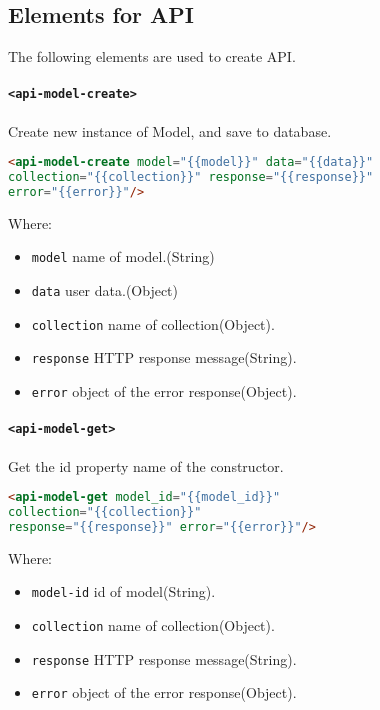 \subsection{Elements for API}\cite{xpr_api}

The following elements are used to create API.

\paragraph{\texttt{<api-model-create>}}

Create new instance of Model, and save to database.

\begin{lstlisting}[language=html]
<api-model-create model="{{model}}" data="{{data}}" 
collection="{{collection}}" response="{{response}}" 
error="{{error}}"/>
\end{lstlisting}
Where:
\begin{itemize}
\item \texttt{model} name of model.(String)
\item \texttt{data} user data.(Object)
\item \texttt{collection} name of collection(Object).
\item \texttt{response}	HTTP response message(String).
\item \texttt{error} object of the error response(Object).
\end{itemize}

\paragraph{\texttt{<api-model-get>}}

Get the id property name of the constructor.

\begin{lstlisting}[language=html]
<api-model-get model_id="{{model_id}}" 
collection="{{collection}}" 
response="{{response}}" error="{{error}}"/>
\end{lstlisting}
Where:
\begin{itemize}
\item \texttt{model-id} id of model(String).
\item \texttt{collection} name of collection(Object).
\item \texttt{response}	HTTP response message(String).
\item \texttt{error} object of the error response(Object).
\end{itemize}

